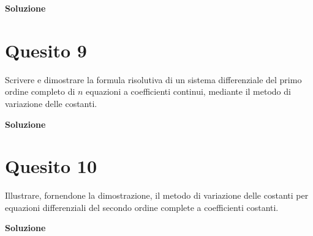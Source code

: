 \medskip
\begin{large}
\textbf{Soluzione}
\end{large}


\section*{Quesito 9}
Scrivere e dimostrare la formula risolutiva di un sistema differenziale del primo
ordine completo di $n$ equazioni a coefficienti continui, mediante il metodo di variazione
delle costanti.

\medskip
\begin{large}
\textbf{Soluzione}
\end{large}


\section*{Quesito 10}
Illustrare, fornendone la dimostrazione, il metodo di variazione delle costanti
per equazioni differenziali del secondo ordine complete a coefficienti costanti.


\medskip
\begin{large}
\textbf{Soluzione}
\end{large}
